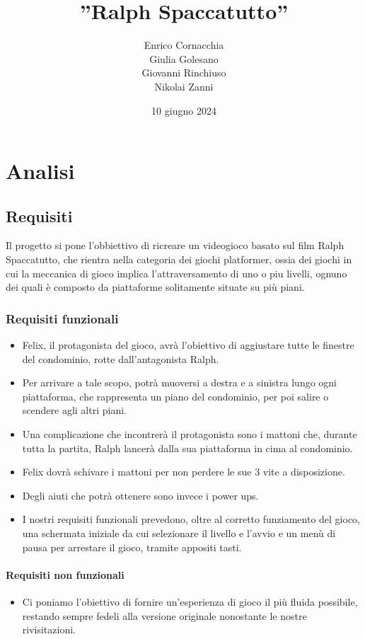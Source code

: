 \documentclass[a4paper,12pt]{report}
\title{''Ralph Spaccatutto''}
\author{Enrico Cornacchia \\ Giulia Golesano \\ Giovanni Rinchiuso \\ Nikolai Zanni}
\date{10 giugno 2024}
\begin{document}
\maketitle

\tableofcontents

\chapter{Analisi}

\section{Requisiti}

Il progetto si pone l'obbiettivo di ricreare un videogioco basato sul film Ralph Spaccatutto, che rientra nella categoria dei giochi platformer, ossia dei giochi in cui la meccanica di gioco implica l'attraversamento di uno o piu livelli, ognuno dei quali è composto da piattaforme solitamente situate su più piani.

\subsection{Requisiti funzionali}

\begin{itemize}

	\item Felix, il protagonista del gioco, avrà l'obiettivo di aggiustare tutte le finestre del condominio, rotte dall'antagonista Ralph. 
	\item Per arrivare a tale scopo, potrà muoversi a destra e a sinistra lungo ogni piattaforma, che rappresenta un piano del condominio, per poi salire o scendere agli altri piani.
	\item Una complicazione che incontrerà il protagonista sono i mattoni che, durante tutta la partita, Ralph lancerà dalla sua piattaforma in cima al condominio.
 \item Felix  dovrà schivare i mattoni per non perdere le sue 3 vite a disposizione.
	\item Degli aiuti che potrà ottenere sono invece i power ups.
	\item I nostri requisiti funzionali prevedono, oltre al corretto funziamento del gioco, una schermata iniziale da cui selezionare il livello e l'avvio e un menù di pausa per arrestare il gioco, tramite appositi tasti.
\end{itemize}

\subsubsection{Requisiti non funzionali}
\begin{itemize}
	\item Ci poniamo l'obiettivo di fornire un'esperienza di gioco il più fluida possibile, restando sempre fedeli alla versione originale nonostante le nostre rivisitazioni.
\end{itemize}
\end{document}
